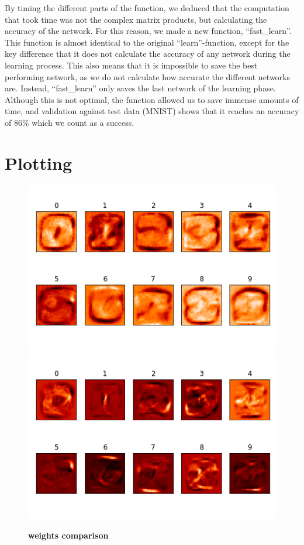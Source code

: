 \documentclass[letterpaper, 12 pt, conference]{ieeeconf}
\begin{document}
By timing the different parts of the function, we deduced that the computation that took time was not the complex matrix products, but calculating the accuracy of the network. For this reason, we made a new function, “fast\_learn”. This function is almost identical to the original “learn”-function, except for the key difference that it does not calculate the accuracy of any network during the learning process. This also means that it is impossible to save the best performing network, as we do not calculate how accurate the different networks are. Instead, “fast\_learn” only saves the last network of the learning phase. Although this is not optimal, the function allowed us to save immense amounts of time, and validation against test data (MNIST) shows that it reaches an accuracy of 86\% which we count as a success. 

\section{Plotting}

\begin{figure}[h]
\caption{\textbf{weights comparison}}
\centering
\includegraphics[scale=0.4]{"../images/linear_network"}
\includegraphics[scale=0.4]{"../images/fast_network"}
\end{figure}
\end{document}
